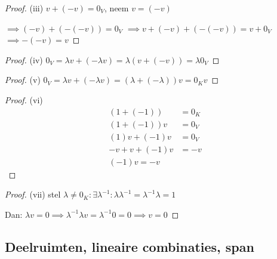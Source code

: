 \begin{proof}(iii)
        \(v + (-v) = 0_V\), neem \(v = (-v)\)

        \(\implies (-v) + (-(-v)) = 0_V\)
        \(\implies  v + (-v) + (-(-v)) = v + 0_V \)
        \(\implies -(-v) = v\)
\end{proof}
\begin{proof}(iv)
    \(
        0_V 
        = \lambda v + (- \lambda v) 
        = \lambda(v + (-v)) 
        = \lambda 0_V
    \)
\end{proof}
\begin{proof}(v)
    \(
        0_V 
        = \lambda v + (- \lambda v) 
        = (\lambda + (-\lambda))v 
        =  0_K v
    \)
\end{proof}
\begin{proof}(vi)
    \begin{align*}
        (1 + (-1)) &= 0_K \\
        (1 + (-1))v &= 0_V \\
        (1)v + (-1)v &= 0_V \\
        -v + v + (-1)v &= -v \\
        (-1)v = -v 
    \end{align*}
\end{proof}
\begin{proof}(vii)
    stel \(\lambda \neq 0_K: \exists \lambda^{-1}: \lambda \lambda^{-1} = \lambda^{-1} \lambda = 1\)

    Dan:
    \(\lambda v = 0 
    \implies \lambda^{-1}\lambda v = \lambda^{-1}0 = 0
        \implies v = 0
    \)
\end{proof}

\subsection{Deelruimten, lineaire combinaties, span}

